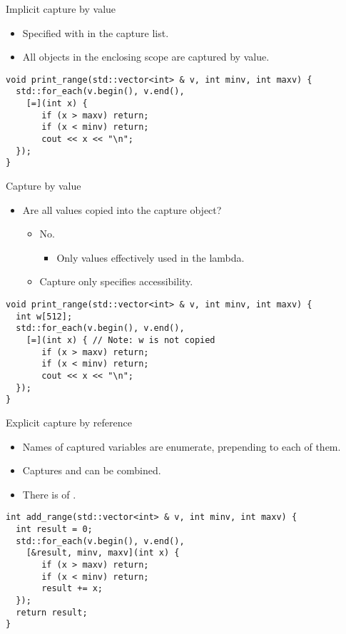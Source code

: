 \begin{frame}[t,fragile]{Implicit capture by value}
  \begin{itemize}
    \item Specified with \cppid{=} in the capture list.
    \item All objects in the enclosing scope are captured by value.
  \end{itemize}
\pause
\begin{lstlisting}
void print_range(std::vector<int> & v, int minv, int maxv) {
  std::for_each(v.begin(), v.end(),
    [=](int x) { 
       if (x > maxv) return;
       if (x < minv) return;
       cout << x << "\n";
  });
}
\end{lstlisting}
\end{frame}

\begin{frame}[t,fragile]{Capture by value}
\begin{itemize}
  \item Are all values copied into the capture object?
    \begin{itemize}
      \pause
      \item No.
        \begin{itemize}
          \item Only values effectively used in the lambda.
        \end{itemize}
        \item Capture only specifies accessibility.
    \end{itemize}
\end{itemize}

\pause
\begin{lstlisting}
void print_range(std::vector<int> & v, int minv, int maxv) {
  int w[512];
  std::for_each(v.begin(), v.end(),
    [=](int x) { // Note: w is not copied
       if (x > maxv) return;
       if (x < minv) return;
       cout << x << "\n";
  });
}
\end{lstlisting}
\end{frame}

\begin{frame}[t,fragile]{Explicit capture by reference}
  \begin{itemize}
    \item Names of captured variables are enumerate, 
          prepending \cppid{\&} to each of them.
    \item Captures  and  can be combined.
    \item There is  of 
          .
  \end{itemize}
\pause
\begin{lstlisting}[escapechar=@]
int add_range(std::vector<int> & v, int minv, int maxv) {
  int result = 0;
  std::for_each(v.begin(), v.end(),
    [&result, minv, maxv](int x) {
       if (x > maxv) return;
       if (x < minv) return;
       result += x;
  });
  return result;
}
\end{lstlisting}
\end{frame}

